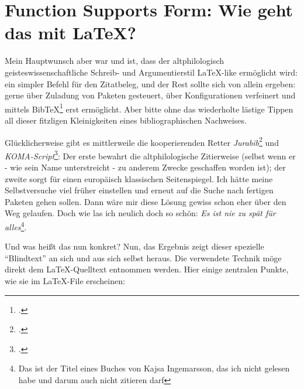 %
%
%
%


\section{Function Supports Form: Wie geht das mit LaTeX?}

Mein Hauptwunsch aber war und ist, dass der altphilologisch
geisteswissenschaftliche Schreib- und Argumentierstil LaTeX-like ermöglicht
wird: ein simpler Befehl für den Zitatbeleg, und der Rest sollte sich von allein
ergeben: gerne über Zuladung von Paketen gesteuert, über Konfigurationen
verfeinert und mittels BibTeX\footcite[vgl.][]{BibtexOrgDe} erst ermöglicht.
Aber bitte ohne das wiederholte lästige Tippen all dieser fitzligen
Kleinigkeiten eines bibliographischen Nachweises.

Glücklicherweise gibt es mittlerweile die kooperierenden Retter
\emph{Jurabib}\footcite[vgl.][]{Berger2004a} und
\emph{KOMA-Script}\footcite[vgl.][]{Kohm2008a}: Der erste bewahrt die
altphilologische Zitierweise (selbst wenn er - wie sein Name unterstreicht - zu
anderem Zwecke geschaffen worden ist); der zweite sorgt für einen europäisch
klassischen Seitenspiegel. Ich hätte meine Selbstversuche viel früher einstellen
und erneut auf die Suche nach fertigen Paketen gehen sollen. Dann wäre mir diese
Lösung gewiss schon eher über den Weg gelaufen. Doch wie las ich neulich doch so
schön: \emph{Es ist nie zu spät für alles}\footnote{Das ist der Titel eines
Buches von Kajsa Ingemarsson, das ich nicht gelesen habe und darum auch nicht
zitieren darf}.

Und was heißt das nun konkret? Nun, das Ergebnis zeigt dieser spezielle
"`Blindtext"' an sich und aus sich selbst heraus. Die verwendete Technik möge
direkt dem LaTeX-Quelltext entnommen werden. Hier einige zentralen Punkte, wie
sie im LaTeX-File erscheinen:

